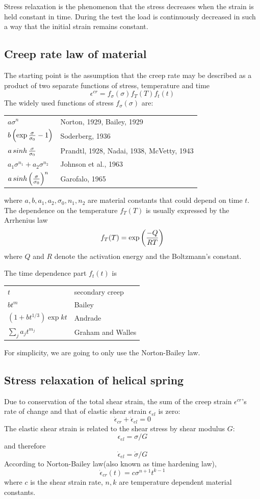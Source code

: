 \documentclass[10pt]{article}
\begin{document}
Stress relaxation is the phenomenon that the stress decreases when the strain is held constant in time. During the test the load is continuously decreased in such a way that the initial strain remains constant.

\subsection{Creep rate law of material}
\label{sec:Creep}
The starting point is the assumption that the creep rate may be described as a product of two separate functions of stress, temperature and time
\[
\epsilon^{cr}=f_\sigma (\sigma) f_T(T) f_t(t)
\]
The widely used functions of stress $f_\sigma(\sigma)$ are:

\begin{tabular}{ll}
$a\sigma^n$ & Norton, 1929, Bailey, 1929 \\
$b\left( \exp{\sigma\over \sigma_0} -1 \right)$ & Soderberg, 1936 \\
$a\mathop{sinh}{\sigma\over \sigma_0}$ & Prandtl, 1928, Nadai, 1938, McVetty, 1943\\
$a_1\sigma^{n_1} + a_2 \sigma^{n_2}$ & Johnson et al., 1963 \\
$a\mathop{sinh} \left( {\sigma\over \sigma_0}\right)^n$ & Garofalo, 1965
\end{tabular}

where $a,b,a_1,a_2,\sigma_0,n_1,n_2$ are material constants that could depend on time $t$. The dependence on the temperature $f_T(T)$ is usually expressed by the Arrhenius law
\[
f_T(T) = \exp \left( {-Q\over RT}\right)
\]
where $Q$ and $R$ denote the activation energy and the Boltzmann's constant.

The time dependence part $f_t(t)$ is

\begin{tabular}{ll}
$t$ & secondary creep \\
$bt^m$ & Bailey \\
$(1+bt^{1/3})\exp{kt}$ & Andrade\\
$\sum_j a_j t^{m_j}$ & Graham and Walles
\end{tabular}

For simplicity, we are going to only use the Norton-Bailey law.
\subsection{Stress relaxation of helical spring}
\label{sec:Relaxation}
Due to conservation of the total shear strain, the sum of the creep strain $\epsilon^{cr}$'s rate of change and that of elastic shear strain $\epsilon_{el}$ is zero:
\[
\dot{\epsilon}_{cr} + \dot{\epsilon}_{el} = 0
\]
The elastic shear strain is related to the shear stress by shear modulus $G$:
\[
\epsilon_{el} = \sigma/G
\]
and therefore
\[
\dot{\epsilon}_{el} = \dot{\sigma}/G
\]
According to Norton-Bailey law(also known as time hardening law),
\begin{equation} \label{eq:N-B}
\dot{\epsilon}_{cr}(t)=c\sigma^{n+1} t^{k-1}
\end{equation}
where $c$ is the shear strain rate, $n,k$ are temperature dependent material constants.
\end{document}
